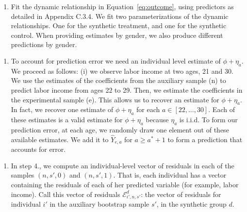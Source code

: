 \documentclass[static]{JJH-Beamer}
\begin{document}
\begin{frame}
 \addtocounter{framenumber}{-1}

\begin{enumerate}[4.]
\item Fit the dynamic relationship in Equation~\eqref{eq:outcome}, using predictors as detailed in Appendix C.3.4. We fit two parameterizations of the dynamic relationships. One for the synthetic treatment, and one for the synthetic control. When providing estimates by gender, we also produce different predictions by gender.
\end{enumerate}

\end{frame}

\begin{frame}
 \addtocounter{framenumber}{-1}

\begin{enumerate}[5.]
\item To account for prediction error we need an individual level estimate of $ \phi + \eta_{a}$. We proceed as follows: (i) we observe labor income at two ages, 21 and 30. We use the estimates of the coefficients from the auxiliary sample (n) to predict labor income from ages 22 to 29. Then, we estimate the coefficients in the experimental sample (e). This allows us to recover an estimate for $\phi + \eta_{a}$. In fact, we recover one estimate of $\phi + \eta_{a}$ for each $a \in \left[22, \ldots, 30 \right]$. Each of these estimates is a valid estimate for $\phi + \eta_{a}$ because $\eta_{a}$ is i.i.d. To form our prediction error, at each age, we randomly draw one element out of these available estimates. We add it to  $\hat{Y}_{e,a}$ for $a \geq a^* + 1$ to form a prediction that accounts for error.
\end{enumerate}

\end{frame}

\begin{frame}
 \addtocounter{framenumber}{-1}

\begin{enumerate}[6.]
\item In step 4., we compute an individual-level vector of residuals in each of the samples $(n,s',0)$ and $(n,s',1)$. That is, each individual has a vector containing the residuals of each of her predicted variable (for example, labor income). Call this vector of residuals $\bm{\mathcal{E}}_{i',n,s'}^d$: the vector of residuals for individual $i'$ in the auxiliary bootstrap sample $s'$, in the synthetic group $d$.
\end{enumerate}

\end{frame}
\end{document}
